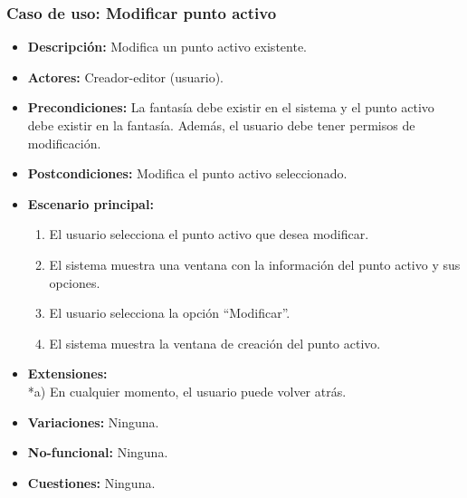 \subsubsection{Caso de uso: Modificar punto activo}
\begin{itemize}
	\item \textbf{Descripción:} Modifica un punto activo existente.
	\item \textbf{Actores:} Creador-editor (usuario).
	\item \textbf{Precondiciones:} La fantasía debe existir en el sistema y el punto activo debe existir en la fantasía. Además, el usuario debe tener permisos de modificación.
	\item \textbf{Postcondiciones:} Modifica el punto activo seleccionado.
	\item \textbf{Escenario principal:}
	\begin{enumerate}
		\item El usuario selecciona el punto activo que desea modificar.
		\item El sistema muestra una ventana con la información del punto activo y sus opciones.
		\item El usuario selecciona la opción ``Modificar''.
		\item El sistema muestra la ventana de creación del punto activo.
	\end{enumerate}
	\item \textbf{Extensiones:} \\ *a) En cualquier momento, el usuario puede volver atrás.
	\item \textbf{Variaciones:} Ninguna.
	\item \textbf{No-funcional:} Ninguna.
	\item \textbf{Cuestiones:} Ninguna.
\end{itemize}

